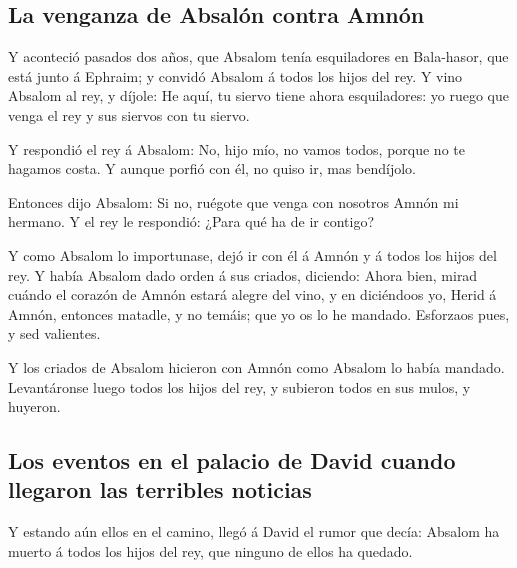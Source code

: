 \hypertarget{la-venganza-de-absaluxf3n-contra-amnuxf3n}{%
\subsection{La venganza de Absalón contra
Amnón}\label{la-venganza-de-absaluxf3n-contra-amnuxf3n}}

 Y aconteció pasados dos años, que Absalom tenía
esquiladores en Bala-hasor, que está junto á Ephraim; y convidó Absalom
á todos los hijos del rey.  Y vino Absalom al rey, y
díjole: He aquí, tu siervo tiene ahora esquiladores: yo ruego que venga
el rey y sus siervos con tu siervo.

 Y respondió el rey á Absalom: No, hijo mío, no vamos
todos, porque no te hagamos costa. Y aunque porfió con él, no quiso ir,
mas bendíjolo.

 Entonces dijo Absalom: Si no, ruégote que venga con
nosotros Amnón mi hermano. Y el rey le respondió: ¿Para qué ha de ir
contigo?

 Y como Absalom lo importunase, dejó ir con él á Amnón y
á todos los hijos del rey.  Y había Absalom dado orden á
sus criados, diciendo: Ahora bien, mirad cuándo el corazón de Amnón
estará alegre del vino, y en diciéndoos yo, Herid á Amnón, entonces
matadle, y no temáis; que yo os lo he mandado. Esforzaos pues, y sed
valientes.

 Y los criados de Absalom hicieron con Amnón como Absalom
lo había mandado. Levantáronse luego todos los hijos del rey, y subieron
todos en sus mulos, y huyeron.

\hypertarget{los-eventos-en-el-palacio-de-david-cuando-llegaron-las-terribles-noticias}{%
\subsection{Los eventos en el palacio de David cuando llegaron las
terribles
noticias}\label{los-eventos-en-el-palacio-de-david-cuando-llegaron-las-terribles-noticias}}

 Y estando aún ellos en el camino, llegó á David el rumor
que decía: Absalom ha muerto á todos los hijos del rey, que ninguno de
ellos ha quedado.

